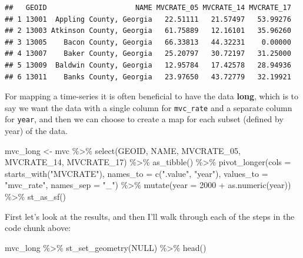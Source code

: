 \documentclass[
]{book}
\newenvironment{Shaded}{\begin{snugshade}}{\end{snugshade}}
\newcommand{\AttributeTok}[1]{\textcolor[rgb]{0.77,0.63,0.00}{#1}}
\newcommand{\ConstantTok}[1]{\textcolor[rgb]{0.00,0.00,0.00}{#1}}
\newcommand{\DecValTok}[1]{\textcolor[rgb]{0.00,0.00,0.81}{#1}}
\newcommand{\FunctionTok}[1]{\textcolor[rgb]{0.00,0.00,0.00}{#1}}
\newcommand{\NormalTok}[1]{#1}
\newcommand{\OtherTok}[1]{\textcolor[rgb]{0.56,0.35,0.01}{#1}}
\newcommand{\SpecialCharTok}[1]{\textcolor[rgb]{0.00,0.00,0.00}{#1}}
\newcommand{\StringTok}[1]{\textcolor[rgb]{0.31,0.60,0.02}{#1}}
\begin{document}
\begin{verbatim}
##   GEOID                     NAME MVCRATE_05 MVCRATE_14 MVCRATE_17
## 1 13001  Appling County, Georgia   22.51111   21.57497   53.99276
## 2 13003 Atkinson County, Georgia   61.75889   12.16101   35.96260
## 3 13005    Bacon County, Georgia   66.33813   44.32231    0.00000
## 4 13007    Baker County, Georgia   25.20797   30.72197   31.25000
## 5 13009  Baldwin County, Georgia   12.95784   17.42578   28.94936
## 6 13011    Banks County, Georgia   23.97650   43.72779   32.19921
\end{verbatim}

For mapping a time-series it is often beneficial to have the data \textbf{long}, which is to say we want the data with a single column for \texttt{mvc\_rate} and a separate column for \texttt{year}, and then we can choose to create a map for each subset (defined by year) of the data.

\begin{Shaded}
\begin{Highlighting}[]
\NormalTok{mvc\_long }\OtherTok{\textless{}{-}}\NormalTok{ mvc }\SpecialCharTok{\%\textgreater{}\%}
  \FunctionTok{select}\NormalTok{(GEOID, NAME, MVCRATE\_05, MVCRATE\_14, MVCRATE\_17) }\SpecialCharTok{\%\textgreater{}\%}
  \FunctionTok{as\_tibble}\NormalTok{() }\SpecialCharTok{\%\textgreater{}\%}
  \FunctionTok{pivot\_longer}\NormalTok{(}\AttributeTok{cols =} \FunctionTok{starts\_with}\NormalTok{(}\StringTok{"MVCRATE"}\NormalTok{),}
               \AttributeTok{names\_to =} \FunctionTok{c}\NormalTok{(}\StringTok{".value"}\NormalTok{, }\StringTok{"year"}\NormalTok{),}
               \AttributeTok{values\_to =} \StringTok{"mvc\_rate"}\NormalTok{,}
               \AttributeTok{names\_sep =} \StringTok{"\_"}\NormalTok{) }\SpecialCharTok{\%\textgreater{}\%}
  \FunctionTok{mutate}\NormalTok{(}\AttributeTok{year =} \DecValTok{2000} \SpecialCharTok{+} \FunctionTok{as.numeric}\NormalTok{(year)) }\SpecialCharTok{\%\textgreater{}\%}
  \FunctionTok{st\_as\_sf}\NormalTok{()}
\end{Highlighting}
\end{Shaded}

First let's look at the results, and then I'll walk through each of the steps in the code chunk above:

\begin{Shaded}
\begin{Highlighting}[]
\NormalTok{mvc\_long }\SpecialCharTok{\%\textgreater{}\%}
  \FunctionTok{st\_set\_geometry}\NormalTok{(}\ConstantTok{NULL}\NormalTok{) }\SpecialCharTok{\%\textgreater{}\%}
  \FunctionTok{head}\NormalTok{()}
\end{Highlighting}
\end{Shaded}
\end{document}
